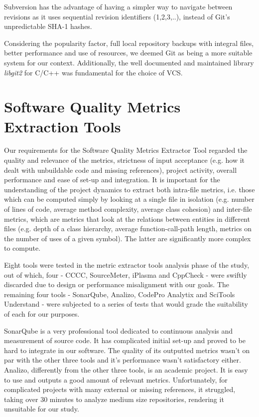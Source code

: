Subversion has the advantage of having a simpler way to navigate between revisions as it uses sequential revision identifiers (1,2,3,..), instead of Git's unpredictable SHA-1 hashes.

Considering the popularity factor, full local repository backups with integral files, better performance and use of resources, we deemed Git as being a more suitable system for our context. Additionally, the well documented and maintained library \textit{libgit2} for C/C++ was fundamental for the choice of VCS.

\section{Software Quality Metrics Extraction Tools} \label{sec:understand}

Our requirements for the Software Quality Metrics Extractor Tool regarded the quality and relevance of the metrics, strictness of input acceptance (e.g. how it dealt with unbuildable code and missing references), project activity, overall performance and ease of set-up and integration. It is important for the understanding of the project dynamics to extract both intra-file metrics, i.e. those which can be computed simply by looking at a single file in isolation (e.g. number of lines of code, average method complexity, average class cohesion) and inter-file metrics, which are metrics that look at the relations between entities in different files (e.g. depth of a class hierarchy, average function-call-path length, metrics on the number of uses of a given symbol). The latter are significantly more complex to compute.

Eight tools were tested in the metric extractor tools analysis phase of the study, out of which, four - CCCC, SourceMeter, iPlasma and CppCheck - were swiftly discarded due to design or performance misalignment with our goals. The remaining four tools - SonarQube, Analizo, CodePro Analytix and SciTools Understand - were subjected to a series of tests that would grade the suitability of each for our purposes.

SonarQube is a very professional tool dedicated to continuous analysis and measurement of source code. It has complicated initial set-up and proved to be hard to integrate in our software. The quality of its outputted metrics wasn't on par with the other three tools and it’s performance wasn’t satisfactory either.
Analizo, differently from the other three tools, is an academic project. It is easy to use and outputs a good amount of relevant metrics. Unfortunately, for complicated projects with many external or missing references, it struggled, taking over 30 minutes to analyze medium size repositories, rendering it unsuitable for our study.

